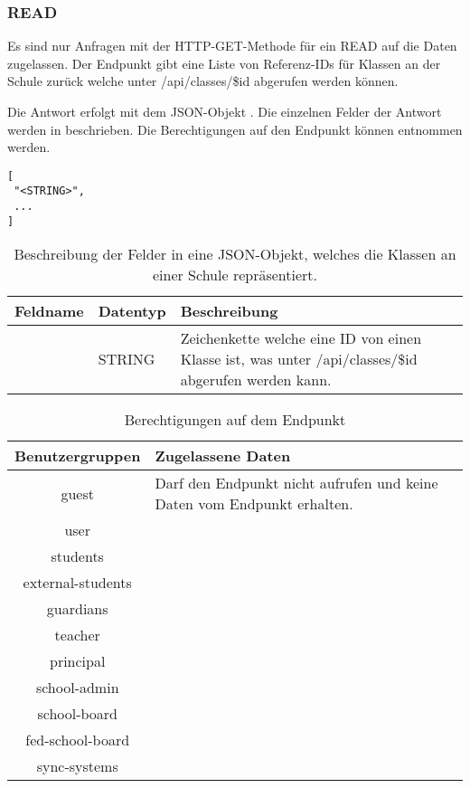 \subsubsection{READ}
\label{sec:rest:api:schools:classes:read}
Es sind nur Anfragen mit der HTTP-GET-Methode für ein READ auf die Daten zugelassen.
Der Endpunkt gibt eine Liste von Referenz-IDs für Klassen an der Schule zurück welche unter /api/classes/\$id abgerufen werden können.

Die Antwort erfolgt mit dem JSON-Objekt . 
Die einzelnen Felder der Antwort werden in  beschrieben.
Die Berechtigungen auf den Endpunkt können  entnommen werden.


\begin{lstlisting}[caption={JSON-Antwort für einen GET-Aufruf der Route /api/schools/\$id/classes},label={lst:code:rest:api:schools:classes:read:ret},frame=tlrb]
[
 "<STRING>",
 ...
]
\end{lstlisting}
\begin{longtable}{|p{}|p{}|p{}|}
		\caption{Beschreibung der Felder in eine JSON-Objekt, welches die Klassen an einer Schule repräsentiert.}
\endfoot
		\caption{Beschreibung der Felder in eine JSON-Objekt, welches die Klassen an einer Schule repräsentiert.}
		\label{tab:rest:api:schools:classes:read:ret:json}
\endlastfoot 
\hline
			\textbf{Feldname} & \textbf{Datentyp} & \textbf{Beschreibung} \\ \hline
\endhead
 & STRING & Zeichenkette welche eine ID von einen Klasse ist, was unter /api/classes/\$id abgerufen werden kann. \\ \hline
\end{longtable}

\begin{longtable}{|c|p{}|}
\caption{Berechtigungen auf dem Endpunkt}
\endfoot
		\caption{Berechtigungen auf dem Endpunkt}
		\label{tab:rest:api:schools:classes:read:right}
\endlastfoot
\hline
\textbf{Benutzergruppen} & \textbf{Zugelassene Daten} \\ \hline
\endhead
guest & Darf den Endpunkt nicht aufrufen und keine Daten vom Endpunkt erhalten. \\ \hline
user &  \\ \hline 
students & \\ \hline
external-students & \\ \hline
guardians & \\ \hline
teacher & \\ \hline
principal & \\ \hline
school-admin & \\ \hline
school-board & \\ \hline
fed-school-board & \\ \hline
sync-systems & \\ \hline
	\end{longtable}